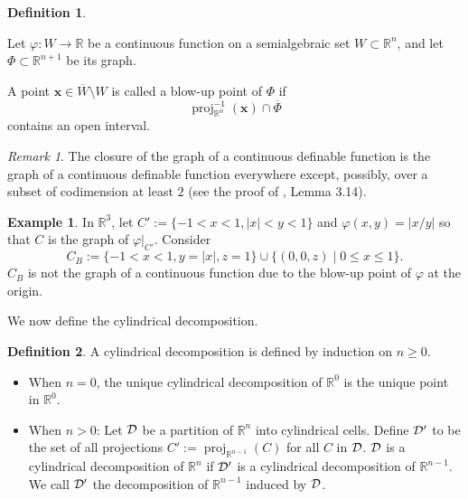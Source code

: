 \documentclass[
]{book}
\theoremstyle{definition}
\newtheorem{definition}{Definition}[chapter]
\theoremstyle{definition}
\newtheorem{example}{Example}[chapter]
\theoremstyle{definition}
\theoremstyle{definition}
\theoremstyle{remark}
\newtheorem*{remark}{Remark}
\begin{document}
\begin{definition}
\protect\hypertarget{def:blow-up-point}{}\label{def:blow-up-point}\citep[Definition 9.2]{bgv15}

Let \(\varphi : W \to \mathbb{R}\) be a continuous function on a semialgebraic set \(W \subset \mathbb{R}^n\), and let \(\Phi \subset \mathbb{R}^{n+1}\) be its graph.

A point \(\mathbf{x} \in \overline{W} \setminus W\) is called a blow-up point of \(\Phi\) if \[\operatorname{proj}^{-1}_{\mathbb{R}^n} (\mathbf{x}) \cap \overline{\Phi}\] contains an open interval.
\end{definition}

\begin{remark}
The closure of the graph of a continuous definable function is the graph of a continuous definable function everywhere
except, possibly, over a subset of codimension at least \(2\) (see the proof of \citet{bgv15}, Lemma 3.14).
\end{remark}

\begin{example}
\protect\hypertarget{exm:top-bottom-not-cylindrical}{}\label{exm:top-bottom-not-cylindrical}In \(\mathbb{R}^3\), let \(C' := \{ -1 < x < 1, \vert x \vert < y < 1 \}\) and \(\varphi(x,y) = \vert x / y \vert\) so that \(C\) is the graph of \(\varphi\vert_{C'}\).
Consider \[
C_B := \{ -1 < x < 1, y = \vert x \vert, z = 1 \} \cup \{ (0,0,z) \mid 0 \le x \le 1 \}.
\]
\(C_B\) is not the graph of a continuous function due to the blow-up point of \(\varphi\) at the origin.
\end{example}

We now define the cylindrical decomposition.

\begin{definition}

A cylindrical decomposition is defined by induction on \(n \ge 0\).

\begin{itemize}
\item
  When \(n = 0\), the unique cylindrical decomposition of \(\mathbb{R}^0\) is the unique point in \(\mathbb{R}^0\).
\item
  When \(n > 0\): Let \(\cal D\) be a partition of \(\mathbb{R}^n\) into cylindrical cells.
  Define \(\cal D'\) to be the set of all projections \(C' := {\operatorname{proj}_{\mathbb{R}^{n-1}}}(C)\) for all \(C\) in \(\cal D\).
  \(\cal D\) is a cylindrical decomposition of \(\mathbb{R}^n\) if \(\cal D'\) is a cylindrical decomposition of \(\mathbb{R}^{n-1}\). We call \(\cal D'\) the decomposition of \(\mathbb{R}^{n-1}\) induced by \(\cal D\).
\end{itemize}

\end{definition}
\end{document}
